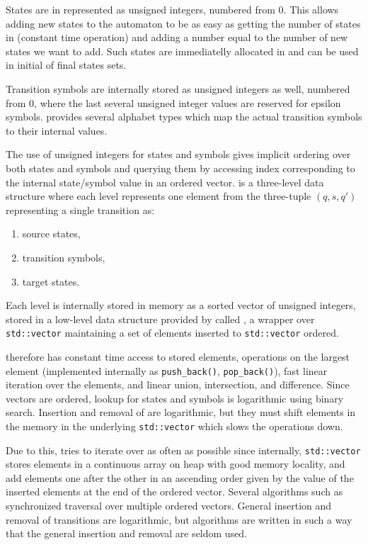 States are in \mata represented as unsigned integers, numbered from 0.
This allows adding new states to the automaton to be as easy as getting the number of states in \deltastruct (constant time operation) and adding a number equal to the number of new states we want to add.
Such states are immediatelly allocated in \deltastruct and can be used in initial of final states sets.

Transition symbols are internally stored as unsigned integers as well, numbered from 0, where the last several unsigned integer values are reserved for epsilon symbols.
\mata provides several alphabet types which map the actual transition symbols to their internal values.

The use of unsigned integers for states and symbols gives implicit ordering over both states and symbols and querying them by accessing index corresponding to the internal state/symbol value in an ordered vector.
\deltastruct is a three-level data structure where each level represents one element from the three-tuple $(q, s, q')$ representing a single transition as:
\begin{enumerate}
    \item source states,
    \item transition symbols,
    \item target states.
\end{enumerate}

Each level is internally stored in memory as a sorted vector of unsigned integers, stored in a low-level data structure provided by \mata called \ordvector, a wrapper over \texttt{std::vector} maintaining a set of elements inserted to \texttt{std::vector} ordered.

\ordvector therefore has constant time access to stored elements, operations on the largest element (implemented internally as \texttt{push\_back()}, \texttt{pop\_back()}), fast linear iteration over the elements, and linear union, intersection, and difference.
Since vectors are ordered, lookup for states and symbols is logarithmic using binary search.
Insertion and removal of are logarithmic, but they must shift elements in the memory in the underlying \texttt{std::vector} which slows the operations down.

Due to this, \mata tries to iterate over \ordvector as often as possible since internally, \texttt{std::vector} stores elements in a continuous array on heap with good memory locality, and add elements one after the other in an ascending order given by the value of the inserted elements at the end of the ordered vector.
Several algorithms such as synchronized traversal over multiple ordered vectors.
General insertion and removal of transitions are logarithmic, but \mata algorithms are written in such a way that the general insertion and removal are seldom used.

